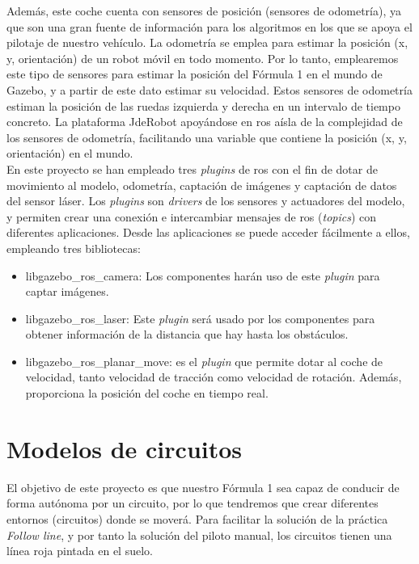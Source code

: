 Además, este coche cuenta con sensores de posición (sensores de odometría), ya que son una gran fuente de información para los algoritmos en los que se apoya el pilotaje de nuestro vehículo. La odometría se emplea para estimar la posición (x, y, orientación) de un robot móvil en todo momento. Por lo tanto, emplearemos este tipo de sensores para estimar la posición del Fórmula 1 en el mundo de Gazebo, y a partir de este dato estimar su velocidad. Estos sensores de odometría estiman la posición de las ruedas izquierda y derecha en un intervalo de tiempo concreto. La plataforma JdeRobot apoyándose en \acrshort{ros} aísla de la complejidad de los sensores de odometría, facilitando una variable que contiene la posición (x, y, orientación) en el mundo.\\

En este proyecto se han empleado tres \textit{plugins} de \acrshort{ros} con el fin de dotar de movimiento al modelo, odometría, captación de imágenes y captación de datos del sensor láser. Los \textit{plugins} son \textit{drivers} de los sensores y actuadores del modelo, y permiten crear una conexión e intercambiar mensajes de \acrshort{ros} (\textit{topics}) con diferentes aplicaciones. Desde las aplicaciones se puede acceder fácilmente a ellos, empleando tres bibliotecas:\\

\begin{itemize}
    \item libgazebo\_ros\_camera: Los componentes harán uso de este \textit{plugin} para captar imágenes.
    
    \item libgazebo\_ros\_laser: Este \textit{plugin} será usado por los componentes para obtener información de la distancia que hay hasta los obstáculos.
    
    \item libgazebo\_ros\_planar\_move: es el \textit{plugin} que permite dotar al coche de velocidad, tanto velocidad de tracción como velocidad de rotación. Además, proporciona la posición del coche en tiempo real.
\end{itemize}


\section{Modelos de circuitos}

El objetivo de este proyecto es que nuestro Fórmula 1 sea capaz de conducir de forma autónoma por un circuito, por lo que tendremos que crear diferentes entornos (circuitos) donde se moverá. Para facilitar la solución de la práctica \textit{Follow line}, y por tanto la solución del piloto manual, los circuitos tienen una línea roja pintada en el suelo.\\

